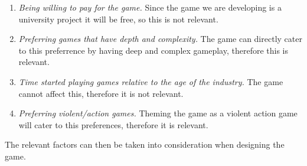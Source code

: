 \begin{enumerate}
\item \emph{Being willing to pay for the game.}
Since the game we are developing is a university project it will be free, so this is not relevant.

\item \emph{Preferring games that have depth and complexity.}
The game can directly cater to this preferrence by having deep and complex gameplay, therefore this is relevant.

\item \emph{Time started playing games relative to the age of the industry.}
The game cannot affect this, therefore it is not relevant.

\item \emph{Preferring violent/action games.}
Theming the game as a violent action game will cater to this preferences, therefore it is relevant.
\end{enumerate}

The relevant factors can then be taken into consideration when designing the game.

